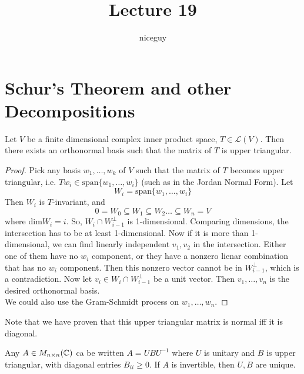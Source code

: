 \documentclass[12pt]{article}
\author{niceguy}
\title{Lecture 19}
\begin{document}
\maketitle

\section{Schur's Theorem and other Decompositions}

\begin{thm}
	Let $V$ be a finite dimensional complex inner product space, $T \in \mathcal L(V)$. Then there exists an orthonormal basis such that the matrix of $T$ is upper triangular.
\end{thm}

\begin{proof}
	Pick any basis $w_1,\dots,w_k$ of $V$ such that the matrix of $T$ becomes upper triangular, i.e. $Tw_i \in \text{span}\{w_1,\dots,w_i\}$ (such as in the Jordan Normal Form). Let
	$$W_i = \text{span}\{w_1,\dots,w_i\}$$
	Then $W_i$ is $T$-invariant, and
	$$0 = W_0 \subseteq W_1 \subseteq W_2 \dots \subseteq W_n = V$$
	where dim$W_i = i$. So, $W_i \cap W_{i-1}^\perp$ is 1-dimensional. Comparing dimensions, the intersection has to be at least 1-dimensional. Now if it is more than 1-dimensional, we can find linearly independent $v_1,v_2$ in the intersection. Either one of them have no $w_i$ component, or they have a nonzero lienar combination that has no $w_i$ component. Then this nonzero vector cannot be in $W_{i-1}^\perp$, which is a contradiction. Now let $v_i \in W_i \cap W_{i-1}^\perp$ be a unit vector. Then $v_1,\dots,v_n$ is the desired orthonormal basis. \\
	We could also use the Gram-Schmidt process on $w_1,\dots,w_n$.
\end{proof}

Note that we have proven that this upper triangular matrix is normal iff it is diagonal.

\begin{thm}
	Any $A \in M_{n\times n}(\mathbb{C})$ ca be written $A=UBU^{-1}$ where $U$ is unitary and $B$ is upper triangular, with diagonal entries $B_{ii} \geq 0$. If $A$ is invertible, then $U,B$ are unique.
\end{thm}
\end{document}
